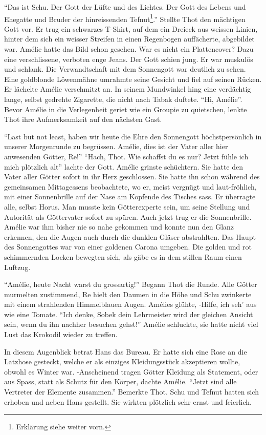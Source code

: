 \documentclass[11pt,titlepage,a5paper]{book}
\begin{document}
"`Das ist Schu. Der Gott der Lüfte und des Lichtes. Der Gott des Lebens und Ehegatte und Bruder der hinreissenden Tefnut\footnote{Erklärung siehe weiter vorn.}."' Stellte Thot den mächtigen  Gott vor. Er trug ein schwarzes T-Shirt, auf dem ein Dreieck aus weissen Linien, hinter dem sich ein weisser Streifen in einen Regenbogen auffächerte, abgebildet war. Amélie hatte das Bild schon gesehen. War es nicht ein Plattencover? Dazu eine verschlissene, verboten enge Jeans. Der Gott schien jung. Er war muskulös und schlank. Die Verwandtschaft mit dem Sonnengott war deutlich zu sehen. Eine goldblonde Löwenmähne umrahmte seine Gesicht und fiel auf seinen Rücken. Er lächelte Amélie verschmitzt an. In seinem Mundwinkel hing eine verdächtig lange, selbst gedrehte Zigarette, die nicht nach Tabak duftete. "`Hi, Amélie"'. Bevor Amélie in die Verlegenheit geriet wie ein Groupie zu quietschen, lenkte Thot ihre Aufmerksamkeit auf den nächsten Gast. 

"`Last but not least, haben wir heute die Ehre den Sonnengott höchstpersönlich in unserer Morgenrunde zu begrüssen. Amélie, dies ist der Vater aller hier anwesenden Götter, Re!"' "`Hach, Thot. Wie schaffst du es nur? Jetzt fühle ich mich plötzlich alt"' lachte der Gott. Amélie grinste schüchtern. Sie hatte den Vater aller Götter sofort in ihr Herz geschlossen. Sie hatte ihn schon während des gemeinsamen Mittagessens beobachtete, wo er, meist vergnügt und laut-fröhlich, mit einer Sonnenbrille auf der Nase am Kopfende des Tisches sass. Er überragte alle, selbst Horus. Man musste kein Götterexperte sein, um seine Stellung und Autorität als Göttervater sofort zu spüren. Auch jetzt trug er die Sonnenbrille. Amélie war ihm bisher nie so nahe gekommen und konnte nun den Glanz erkennen, den die Augen auch durch die dunklen Gläser abstrahlten. Das Haupt des Sonnengottes war von einer goldenen Carona umgeben. Die golden und rot schimmernden Locken bewegten sich, als gäbe es in dem stillen Raum einen Luftzug. 

"`Amélie, heute Nacht warst du grossartig!"' Begann Thot die Runde. Alle Götter murmelten zustimmend, Re hielt den Daumen in die Höhe und Schu zwinkerte mit einem strahlenden Himmelblauen Augen. Amélies glühte, -Hilfe, ich seh' aus wie eine Tomate. "`Ich denke, Sobek dein Lehrmeister wird der gleichen Ansicht sein, wenn du ihn nachher besuchen gehst!"' Amélie schluckte, sie hatte nicht viel Lust das Krokodil wieder zu treffen. 

In diesem Augenblick betrat Hans das Bureau. Er hatte sich eine Rose an die Latzhose gesteckt, welche er als einziges Kleidungsstück akzeptieren wollte, obwohl es Winter war. -Anscheinend tragen Götter Kleidung als Statement, oder aus Spass, statt als Schutz für den Körper, dachte Amélie. "`Jetzt sind alle Vertreter der Elemente zusammen."' Bemerkte Thot. Schu und Tefnut hatten sich erhoben und neben Hans gestellt. Sie wirkten plötzlich sehr ernst und feierlich. 
\end{document}
